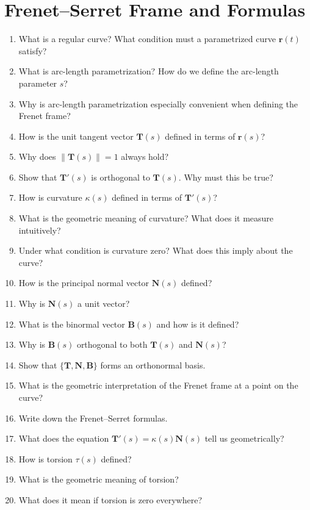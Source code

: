 \section{Frenet--Serret Frame and Formulas}

\begin{enumerate}
  \item What is a regular curve? What condition must a parametrized curve \(\mathbf{r}(t)\) satisfy?
  \item What is arc-length parametrization? How do we define the arc-length parameter \(s\)?
  \item Why is arc-length parametrization especially convenient when defining the Frenet frame?
  \item How is the unit tangent vector \(\mathbf{T}(s)\) defined in terms of \(\mathbf{r}(s)\)?
  \item Why does \(\|\mathbf{T}(s)\| = 1\) always hold?
  \item Show that \(\mathbf{T}'(s)\) is orthogonal to \(\mathbf{T}(s)\). Why must this be true?
  \item How is curvature \(\kappa(s)\) defined in terms of \(\mathbf{T}'(s)\)?
  \item What is the geometric meaning of curvature? What does it measure intuitively?
  \item Under what condition is curvature zero? What does this imply about the curve?
  \item How is the principal normal vector \(\mathbf{N}(s)\) defined?
  \item Why is \(\mathbf{N}(s)\) a unit vector?
  \item What is the binormal vector \(\mathbf{B}(s)\) and how is it defined?
  \item Why is \(\mathbf{B}(s)\) orthogonal to both \(\mathbf{T}(s)\) and \(\mathbf{N}(s)\)?
  \item Show that \(\{\mathbf{T}, \mathbf{N}, \mathbf{B}\}\) forms an orthonormal basis.
  \item What is the geometric interpretation of the Frenet frame at a point on the curve?
  \item Write down the Frenet--Serret formulas.
  \item What does the equation \(\mathbf{T}'(s) = \kappa(s)\mathbf{N}(s)\) tell us geometrically?
  \item How is torsion \(\tau(s)\) defined?
  \item What is the geometric meaning of torsion?
  \item What does it mean if torsion is zero everywhere?

\end{enumerate}
